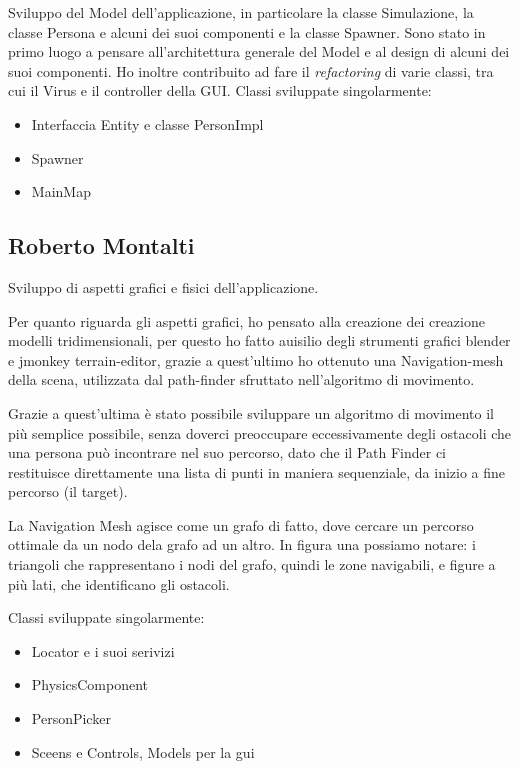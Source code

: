 \documentclass[a4paper,12pt]{report}
\begin{document}
Sviluppo del Model dell'applicazione, in particolare la classe Simulazione, la classe Persona e alcuni dei suoi componenti e la classe Spawner. Sono stato in primo luogo a pensare all'architettura generale del Model e al design di alcuni dei suoi componenti. Ho inoltre contribuito ad fare il \textit{refactoring} di varie classi, tra cui il Virus e il controller della GUI.
Classi sviluppate singolarmente:
\begin{itemize}
\item Interfaccia Entity e classe PersonImpl
\item Spawner
\item MainMap
\end{itemize}

\subsection{Roberto Montalti}

Sviluppo di aspetti grafici e fisici dell'applicazione.

Per quanto riguarda gli aspetti grafici, ho pensato alla creazione dei creazione modelli tridimensionali, per questo ho fatto auisilio degli strumenti grafici blender e jmonkey terrain-editor, grazie a quest'ultimo ho ottenuto una Navigation-mesh della scena, utilizzata dal path-finder sfruttato nell'algoritmo di movimento.

Grazie a quest'ultima è stato possibile sviluppare un algoritmo di movimento il più semplice possibile, senza doverci preoccupare eccessivamente degli ostacoli che una persona può incontrare nel suo percorso,
dato che il Path Finder ci restituisce direttamente una lista di punti in maniera sequenziale, da inizio a fine percorso (il target).

La Navigation Mesh agisce come un grafo di fatto, dove cercare un percorso ottimale da un nodo dela grafo ad un altro.
In figura una possiamo notare: i triangoli che rappresentano i nodi del grafo, quindi le zone navigabili, e figure a più lati, che identificano gli ostacoli.

Classi sviluppate singolarmente:
\begin{itemize}
\item Locator e i suoi serivizi
\item PhysicsComponent
\item PersonPicker
\item Sceens e Controls, Models per la gui
\end{itemize}
\end{document}
